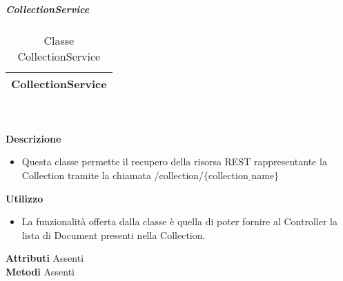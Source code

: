 			\subparagraph{CollectionService} 
\begin{table}[ht]
\begin{center}
\bgroup
	\setlength{\arrayrulewidth}{0.6mm}
	\def\arraystretch{1}
		\begin{tabular}{ | p{12cm} | }
				\hline  
					\centerline{\textbf{CollectionService}}
		\\ \hline 
				\hline
				\hline
		
		\end{tabular}
\egroup
\caption{Classe CollectionService}
\end{center}
\end{table} \textbf{\\ \\ Descrizione}
\begin{itemize}
\item[] Questa classe permette il recupero della risorsa REST rappresentante la Collection tramite la chiamata  /collection/$\{$collection$\_$name$\}$
\end{itemize} 
\textbf{Utilizzo}
\begin{itemize}
\item[] La  funzionalità offerta dalla classe è quella di poter fornire al Controller la lista di Document presenti nella Collection.
\end{itemize}
\textbf{Attributi}
Assenti \\
\textbf{Metodi}
Assenti \\

